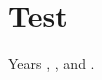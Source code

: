 \documentclass{article}
\begin{document}
\section{Test}\label{sec:test}
Years \citeyear{k1}, \citeyear[p.~4]{k2}, and \citeyear[see][p.~5]{k3, k4}.


\end{document}
